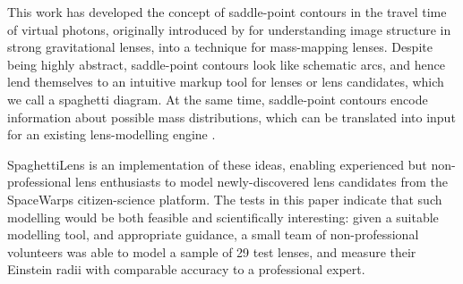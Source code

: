 \documentclass[usenatbib]{mn2e}
\newcommand{\spl}{SpaghettiLens\xspace}
\newcommand{\sw}{SpaceWarps\xspace}
\begin{document}
This work has developed the concept of saddle-point contours in the
travel time of virtual photons, originally introduced by
\cite{1986ApJ...310..568B} for understanding image structure in strong
gravitational lenses, into a technique for mass-mapping lenses.
Despite being highly abstract, saddle-point contours look like
schematic arcs, and hence lend themselves to an intuitive markup tool
for lenses or lens candidates, which we call a spaghetti diagram.  At
the same time, saddle-point contours encode information about possible
mass distributions, which can be translated into input for an existing
lens-modelling engine \citep[GLASS, by][]{2014arXiv1401.7990C}.

\spl is an implementation of these ideas, enabling experienced but
non-professional lens enthusiasts to model newly-discovered lens
candidates from the \sw citizen-science platform.  The tests in this
paper indicate that such modelling would be both feasible and
scientifically interesting: given a suitable modelling tool, and
appropriate guidance, a small team of non-professional volunteers was
able to model a sample of 29 test lenses, and measure their Einstein
radii with comparable accuracy to a professional expert.
\end{document}
